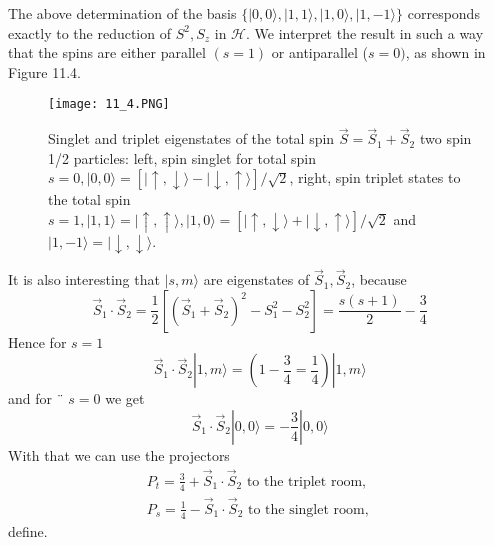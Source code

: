 The above determination of the basis $\{|0,0\rangle,|1,1\rangle,|1,0\rangle,|1,-1\rangle\}$ corresponds exactly to the reduction of $S^2, S_z$ in $\mathcal{H}$. We interpret the result in such a way that the spins are either parallel $( s = 1)$ or antiparallel ($s = 0)$, as shown in Figure 11.4.
\begin{figure}[ht]
        \centering
        \texttt{[image: 11\_4.PNG]}
        \caption{Singlet and triplet eigenstates of the total spin $\vec{S}=\vec{S}_1+\vec{S}_2$ two spin 1/2 particles: left, spin singlet for total spin $s=0,|0,0\rangle=[|\uparrow,\downarrow\rangle-|\downarrow,\uparrow\rangle]/\sqrt{2}$, right, spin triplet states to the total spin $s=1,|1,1\rangle=|\uparrow, \uparrow\rangle,|1,0\rangle=[|\uparrow, \downarrow\rangle+|\downarrow, \uparrow\rangle] / \sqrt{2}$ and $|1,-1\rangle=|\downarrow, \downarrow\rangle$.}
\end{figure}
It is also interesting that $| s, m\rangle$ are eigenstates of $\vec{S}_1,\vec{S}_2$, because
\begin{equation}
    \vec{S}_{1} \cdot \vec{S}_{2}=\frac{1}{2}\left[\left(\vec{S}_{1}+\vec{S}_{2}\right)^{2}-S_{1}^{2}-S_{2}^{2}\right]=\frac{s(s+1)}{2}-\frac{3}{4}
    \end{equation}
Hence for $s = 1$
\begin{equation}
    \vec{S}_{1} \cdot \vec{S}_{2}|1, m\rangle=\left(1-\frac{3}{4}=\frac{1}{4}\right)|1, m\rangle
    \end{equation}
and for ¨ $s = 0$ we get
\begin{equation}
    \vec{S}_{1} \cdot \vec{S}_{2}|0,0\rangle=-\frac{3}{4}|0,0\rangle
    \end{equation}
With that we can use the projectors
%
\begin{equation}
\begin{array}{l}{P_{t}=\frac{3}{4}+\vec{S}_{1} \cdot \vec{S}_{2} \text { to the triplet room, }} \\ {P_{s}=\frac{1}{4}-\vec{S}_{1} \cdot \vec{S}_{2} \text { to the singlet room, }}\end{array}
\end{equation}
define.
